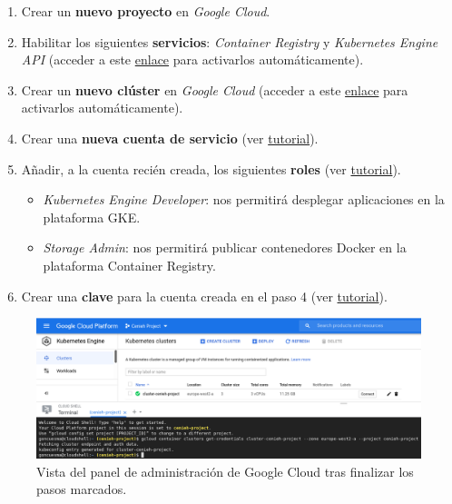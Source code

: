 \documentclass[
]{article}
\providecommand{\tightlist}{%
  \setlength{\itemsep}{0pt}\setlength{\parskip}{0pt}}
\begin{document}
\begin{enumerate}
\def\labelenumi{\arabic{enumi}.}
\tightlist
\item
  Crear un \textbf{nuevo proyecto} en \emph{Google Cloud}.
\item
  Habilitar los siguientes \textbf{servicios}: \emph{Container Registry}
  y \emph{Kubernetes Engine API} (acceder a este
  \href{https://console.cloud.google.com/flows/enableapi?apiid=containerregistry.googleapis.com,container.googleapis.com}{enlace}
  para activarlos automáticamente).
\item
  Crear un \textbf{nuevo clúster} en \emph{Google Cloud} (acceder a este
  \href{https://cloud.google.com/kubernetes-engine/docs/quickstart\#create_cluster}{enlace}
  para activarlos automáticamente).
\item
  Crear una \textbf{nueva cuenta de servicio} (ver
  \href{https://cloud.google.com/iam/docs/creating-managing-service-accounts}{tutorial}).
\item
  Añadir, a la cuenta recién creada, los siguientes \textbf{roles} (ver
  \href{https://cloud.google.com/iam/docs/granting-roles-to-service-accounts\#granting_access_to_a_service_account_for_a_resource}{tutorial}).

  \begin{itemize}
  \tightlist
  \item
    \emph{Kubernetes Engine Developer}: nos permitirá desplegar
    aplicaciones en la plataforma GKE.
  \item
    \emph{Storage Admin}: nos permitirá publicar contenedores Docker en
    la plataforma Container Registry.
  \end{itemize}
\item
  Crear una \textbf{clave} para la cuenta creada en el paso 4 (ver
  \href{https://cloud.google.com/iam/docs/creating-managing-service-account-keys}{tutorial}).
\end{enumerate}

\begin{figure}
\hypertarget{gke-cluster}{%
\centering
\includegraphics{../_static/images/gke-cluster.png}
\caption{Vista del panel de administración de Google Cloud tras
finalizar los pasos marcados.}\label{gke-cluster}
}
\end{figure}
\end{document}
